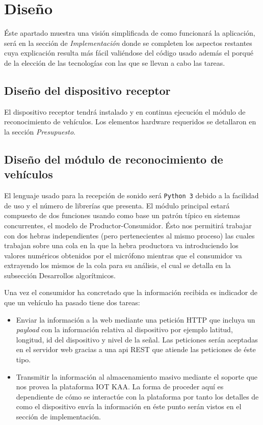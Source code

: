 \chapter{Diseño}\label{chap5}

Éste apartado muestra una visión simplificada de como funcionará la aplicación, será en la sección de \textit{Implementación} donde se completen los aspectos restantes cuya explicación resulta más fácil valiéndose del código usado además el porqué de la elección de las tecnologías con las que se llevan a cabo las tareas.

\section{Diseño del dispositivo receptor}

El dispositivo receptor tendrá instalado y en continua ejecución el módulo de reconocimiento de vehículos. Los elementos hardware requeridos se detallaron en la sección \textit{Presupuesto}.

\section{Diseño del módulo de reconocimiento de vehículos}
El lenguaje usado para la recepción de sonido será {\tt Python 3} debido a la facilidad de uso y el número de librerías que presenta. El módulo principal estará compuesto de dos funciones usando como base un patrón típico en sistemas concurrentes, el  modelo de Productor-Consumidor. Ésto nos permitirá trabajar con dos hebras independientes (pero pertenecientes al mismo proceso) las cuales trabajan sobre una cola en la que la hebra productora va introduciendo los valores numéricos obtenidos por el micrófono mientras que el consumidor va extrayendo los mismos de la cola para su análisis, el cual se detalla en la subsección Desarrollos algorítmicos.

Una vez el consumidor ha concretado que la información recibida es indicador de que un vehículo ha pasado tiene dos tareas:

\begin{itemize}
  \item Enviar la información a la web mediante una petición HTTP que incluya un \textit{payload} con la información relativa al dispositivo por ejemplo latitud, longitud, id del dispositivo y nivel de la señal. Las peticiones serán aceptadas en el servidor web gracias a una api REST que atiende las peticiones de éste tipo.
  \item Transmitir la información al almacenamiento masivo mediante el soporte que nos provea la plataforma IOT KAA. La forma de proceder aquí es dependiente de cómo se interactúe con la plataforma por tanto los detalles de como el dispositivo envía la información en éste punto serán vistos en el sección de implementación.
\end{itemize}

